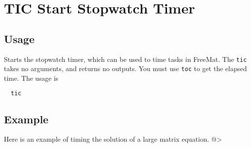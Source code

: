 \section{TIC Start Stopwatch Timer}

\subsection{Usage}

Starts the stopwatch timer, which can be used to time tasks in FreeMat.
The \verb|tic| takes no arguments, and returns no outputs.  You must use
\verb|toc| to get the elapsed time.  The usage is
\begin{verbatim}
  tic
\end{verbatim}
\subsection{Example}

Here is an example of timing the solution of a large matrix equation.
@>
